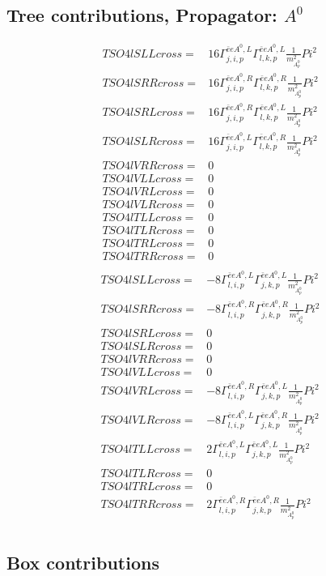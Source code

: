 \documentclass[A4,landscape]{article}
\begin{document}
\subsection{Tree contributions, Propagator: $A^0$} 

\begin{align} 
  TSO4lSLLcross= & 16 \Gamma^{\bar{e}e A^0 ,L}_{j, i, p} \Gamma^{\bar{e}e A^0 ,L}_{l, k, p} \frac{1}{m^2_{A^0_{{p}}}} Pi^2 \\ 
  TSO4lSRRcross= & 16 \Gamma^{\bar{e}e A^0 ,R}_{j, i, p} \Gamma^{\bar{e}e A^0 ,R}_{l, k, p} \frac{1}{m^2_{A^0_{{p}}}} Pi^2 \\ 
  TSO4lSRLcross= & 16 \Gamma^{\bar{e}e A^0 ,R}_{j, i, p} \Gamma^{\bar{e}e A^0 ,L}_{l, k, p} \frac{1}{m^2_{A^0_{{p}}}} Pi^2 \\ 
  TSO4lSLRcross= & 16 \Gamma^{\bar{e}e A^0 ,L}_{j, i, p} \Gamma^{\bar{e}e A^0 ,R}_{l, k, p} \frac{1}{m^2_{A^0_{{p}}}} Pi^2 \\ 
  TSO4lVRRcross= & 0 \\ 
  TSO4lVLLcross= & 0 \\ 
  TSO4lVRLcross= & 0 \\ 
  TSO4lVLRcross= & 0 \\ 
  TSO4lTLLcross= & 0 \\ 
  TSO4lTLRcross= & 0 \\ 
  TSO4lTRLcross= & 0 \\ 
  TSO4lTRRcross= & 0 \\ 
\end{align} 
\begin{align} 
  TSO4lSLLcross= & -8 \Gamma^{\bar{e}e A^0 ,L}_{l, i, p} \Gamma^{\bar{e}e A^0 ,L}_{j, k, p} \frac{1}{m^2_{A^0_{{p}}}} Pi^2 \\ 
  TSO4lSRRcross= & -8 \Gamma^{\bar{e}e A^0 ,R}_{l, i, p} \Gamma^{\bar{e}e A^0 ,R}_{j, k, p} \frac{1}{m^2_{A^0_{{p}}}} Pi^2 \\ 
  TSO4lSRLcross= & 0 \\ 
  TSO4lSLRcross= & 0 \\ 
  TSO4lVRRcross= & 0 \\ 
  TSO4lVLLcross= & 0 \\ 
  TSO4lVRLcross= & -8 \Gamma^{\bar{e}e A^0 ,R}_{l, i, p} \Gamma^{\bar{e}e A^0 ,L}_{j, k, p} \frac{1}{m^2_{A^0_{{p}}}} Pi^2 \\ 
  TSO4lVLRcross= & -8 \Gamma^{\bar{e}e A^0 ,L}_{l, i, p} \Gamma^{\bar{e}e A^0 ,R}_{j, k, p} \frac{1}{m^2_{A^0_{{p}}}} Pi^2 \\ 
  TSO4lTLLcross= & 2 \Gamma^{\bar{e}e A^0 ,L}_{l, i, p} \Gamma^{\bar{e}e A^0 ,L}_{j, k, p} \frac{1}{m^2_{A^0_{{p}}}} Pi^2 \\ 
  TSO4lTLRcross= & 0 \\ 
  TSO4lTRLcross= & 0 \\ 
  TSO4lTRRcross= & 2 \Gamma^{\bar{e}e A^0 ,R}_{l, i, p} \Gamma^{\bar{e}e A^0 ,R}_{j, k, p} \frac{1}{m^2_{A^0_{{p}}}} Pi^2 \\ 
\end{align} 
\subsection{Box contributions} 
\end{document}
